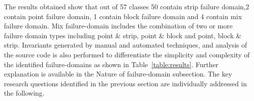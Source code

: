 \documentclass[runningheads,a4paper]{llncs}
\begin{document}
The results obtained show that out of 57 classes 50 contain strip failure domain,2 contain point failure domain, 1 contain block failure domain and 4 contain mix failure domain. Mix failure-domain includes the combination of two or more failure domain types including point \& strip, point \& block and point, block \& strip. Invariants generated by manual and automated techniques, and analysis of the source code is also performed to differentiate the simplicity and complexity of the identified failure-domains as shown in Table~\ref{table:results}. Further explanation is available in the Nature of failure-domain subsection. The key research questions identified in the previous section are individually addressed in the following.





\end{document}
